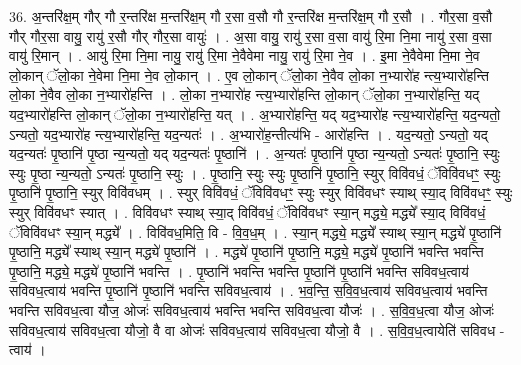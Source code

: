 \documentclass[17pt]{extarticle}
\begin{document}
36. अ॒न्तरि॑क्ष॒म् गौर् गौ र॒न्तरि॑क्ष म॒न्तरि॑क्ष॒म् गौ र॒सा व॒सौ गौ र॒न्तरि॑क्ष म॒न्तरि॑क्ष॒म् गौ र॒सौ । . गौर॒सा व॒सौ गौर् गौर॒सा वायु॒ रायु॑ र॒सौ गौर् गौर॒सा वायुः॑ । . अ॒सा वायु॒ रायु॑ र॒सा व॒सा वायु॑ रि॒मा नि॒मा नायु॑ र॒सा व॒सा वायु॑ रि॒मान् । . आयु॑ रि॒मा नि॒मा नायु॒ रायु॑ रि॒मा ने॒वैवेमा नायु॒ रायु॑ रि॒मा ने॒व । . इ॒मा ने॒वैवेमा नि॒मा ने॒व लो॒कान् ॅलो॒का ने॒वेमा नि॒मा ने॒व लो॒कान् । . ए॒व लो॒कान् ॅलो॒का ने॒वैव लो॒का न॒भ्यारो॑ह न्त्य॒भ्यारो॑हन्ति लो॒का ने॒वैव लो॒का न॒भ्यारो॑हन्ति । . लो॒का न॒भ्यारो॑ह न्त्य॒भ्यारो॑हन्ति लो॒कान् ॅलो॒का न॒भ्यारो॑हन्ति॒ यद् यद॒भ्यारो॑हन्ति लो॒कान् ॅलो॒का न॒भ्यारो॑हन्ति॒ यत् । . अ॒भ्यारो॑हन्ति॒ यद् यद॒भ्यारो॑ह न्त्य॒भ्यारो॑हन्ति॒ यद॒न्यतो॒ ऽन्यतो॒ यद॒भ्यारो॑ह न्त्य॒भ्यारो॑हन्ति॒ यद॒न्यतः॑ । . अ॒भ्यारो॑ह॒न्तीत्य॑भि - आरो॑हन्ति । . यद॒न्यतो॒ ऽन्यतो॒ यद् यद॒न्यतः॑ पृ॒ष्ठानि॑ पृ॒ष्ठा न्य॒न्यतो॒ यद् यद॒न्यतः॑ पृ॒ष्ठानि॑ । . अ॒न्यतः॑ पृ॒ष्ठानि॑ पृ॒ष्ठा न्य॒न्यतो॒ ऽन्यतः॑ पृ॒ष्ठानि॒ स्युः स्युः पृ॒ष्ठा न्य॒न्यतो॒ ऽन्यतः॑ पृ॒ष्ठानि॒ स्युः । . पृ॒ष्ठानि॒ स्युः स्युः पृ॒ष्ठानि॑ पृ॒ष्ठानि॒ स्युर् विवि॑वधं॒ ॅविवि॑वधꣳ॒॒ स्युः पृ॒ष्ठानि॑ पृ॒ष्ठानि॒ स्युर् विवि॑वधम् । . स्युर् विवि॑वधं॒ ॅविवि॑वधꣳ॒॒ स्युः स्युर् विवि॑वधꣳ स्याथ् स्या॒द् विवि॑वधꣳ॒॒ स्युः स्युर् विवि॑वधꣳ स्यात् । . विवि॑वधꣳ स्याथ् स्या॒द् विवि॑वधं॒ ॅविवि॑वधꣳ स्या॒न् मद्ध्ये॒ मद्ध्ये᳚ स्या॒द् विवि॑वधं॒ ॅविवि॑वधꣳ स्या॒न् मद्ध्ये᳚ । . विवि॑वध॒मिति॒ वि - वि॒व॒ध॒म् । . स्या॒न् मद्ध्ये॒ मद्ध्ये᳚ स्याथ् स्या॒न् मद्ध्ये॑ पृ॒ष्ठानि॑ पृ॒ष्ठानि॒ मद्ध्ये᳚ स्याथ् स्या॒न् मद्ध्ये॑ पृ॒ष्ठानि॑ । . मद्ध्ये॑ पृ॒ष्ठानि॑ पृ॒ष्ठानि॒ मद्ध्ये॒ मद्ध्ये॑ पृ॒ष्ठानि॑ भवन्ति भवन्ति पृ॒ष्ठानि॒ मद्ध्ये॒ मद्ध्ये॑ पृ॒ष्ठानि॑ भवन्ति । . पृ॒ष्ठानि॑ भवन्ति भवन्ति पृ॒ष्ठानि॑ पृ॒ष्ठानि॑ भवन्ति सविवध॒त्वाय॑ सविवध॒त्वाय॑ भवन्ति पृ॒ष्ठानि॑ पृ॒ष्ठानि॑ भवन्ति सविवध॒त्वाय॑ । . भ॒व॒न्ति॒ स॒वि॒व॒ध॒त्वाय॑ सविवध॒त्वाय॑ भवन्ति भवन्ति सविवध॒त्वा यौज॒ ओजः॑ सविवध॒त्वाय॑ भवन्ति भवन्ति सविवध॒त्वा यौजः॑ । . स॒वि॒व॒ध॒त्वा यौज॒ ओजः॑ सविवध॒त्वाय॑ सविवध॒त्वा यौजो॒ वै वा ओजः॑ सविवध॒त्वाय॑ सविवध॒त्वा यौजो॒ वै । . स॒वि॒व॒ध॒त्वायेति॑ सविवध - त्वाय॑ । \newline
\pagebreak
{}
\end{document}
